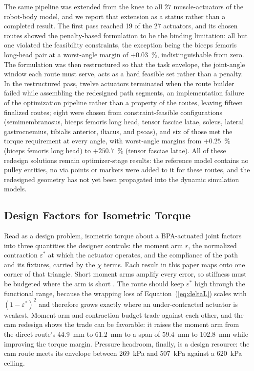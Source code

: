 \documentclass[utf8]{FrontiersinHarvard} %
\begin{document}
The same pipeline was extended from the knee to all 27 muscle-actuators of the robot-body model, and we report that extension as a status rather than a completed result. The first pass reached 19 of the 27 actuators, and its chosen routes showed the penalty-based formulation to be the binding limitation: all but one violated the feasibility constraints, the exception being the biceps femoris long-head pair at a worst-angle margin of $+0.03$~\%, indistinguishable from zero. The formulation was then restructured so that the task envelope, the joint-angle window each route must serve, acts as a hard feasible set rather than a penalty. In the restructured pass, twelve actuators terminated when the route builder failed while assembling the redesigned path segments, an implementation failure of the optimization pipeline rather than a property of the routes, leaving fifteen finalized routes; eight were chosen from constraint-feasible configurations (semimembranosus, biceps femoris long head, tensor fasciae latae, soleus, lateral gastrocnemius, tibialis anterior, iliacus, and psoas), and six of those met the torque requirement at every angle, with worst-angle margins from $+0.25$~\% (biceps femoris long head) to $+250.7$~\% (tensor fasciae latae). All of these redesign solutions remain optimizer-stage results: the reference model contains no pulley entities, no via points or markers were added to it for these routes, and the redesigned geometry has not yet been propagated into the dynamic simulation models.

\subsection{Design Factors for Isometric Torque}\label{sec:design_factors}

Read as a design problem, isometric torque about a BPA-actuated joint factors into three quantities the designer controls: the moment arm $r$, the normalized contraction $\varepsilon^{*}$ at which the actuator operates, and the compliance of the path and its fixtures, carried by the $\chi$ terms. Each result in this paper maps onto one corner of that triangle. Short moment arms amplify every error, so stiffness must be budgeted where the arm is short \citep{young_analyzing_2019}. The route should keep $\varepsilon^{*}$ high through the functional range, because the wrapping loss of Equation~(\ref{eq:deltaL}) scales with $(1 - \varepsilon^{*})^{2}$ and therefore grows exactly where an under-contracted actuator is weakest. Moment arm and contraction budget trade against each other, and the cam redesign shows the trade can be favorable: it raises the moment arm from the direct route's \qty{44.9}{\mm} to \qty{61.2}{\mm} to a span of \qty{59.4}{\mm} to \qty{102.8}{\mm} while improving the torque margin. Pressure headroom, finally, is a design resource: the cam route meets its envelope between \qty{269}{\kPa} and \qty{507}{\kPa} against a \qty{620}{\kPa} ceiling.
\end{document}
